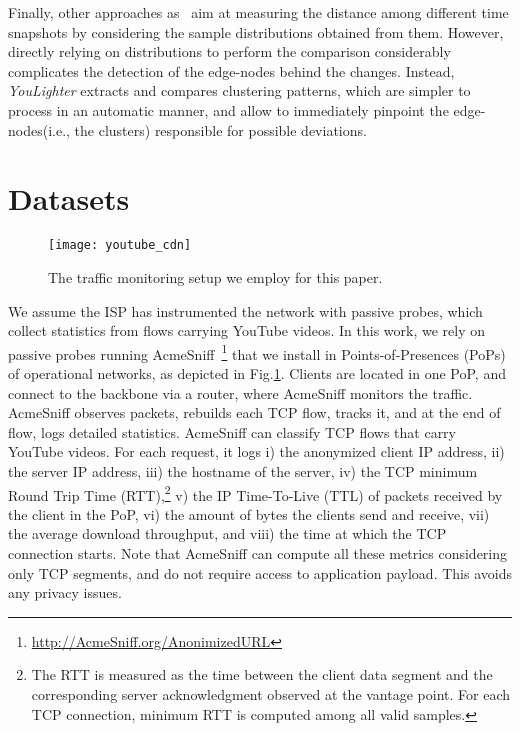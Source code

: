 \documentclass{acm_proc_article-sp}
\newcommand{\tool}{\textit{YouLighter}\xspace}
\newcommand{\nodes}{{edge-nodes}\xspace}
\newcommand{\tstat}{{AcmeSniff}\xspace}
\begin{document}
Finally, other approaches as~\cite{KiferVLDB04} aim at measuring the distance among different time snapshots by considering the sample distributions obtained from them. However, directly relying on distributions to perform the comparison considerably complicates the detection of the \nodes behind the changes. Instead, \tool extracts and compares clustering patterns, which are simpler to process in an automatic manner, and allow to immediately pinpoint the \nodes (i.e., the clusters) responsible for possible deviations.
\section{Datasets}
\label{sec:dataset}

\begin{figure}[t!]
\centering
    \texttt{[image: youtube\_cdn]}
    \caption{The traffic monitoring setup we employ for this paper.}
    \label{fig:tstat}
\end{figure}

We assume the ISP has instrumented the network with passive probes, which collect statistics from flows carrying YouTube videos.
In this work, we rely on passive probes running \tstat~\footnote{\url{http://AcmeSniff.org/AnonimizedURL}} that we install in Points-of-Presences (PoPs) of operational networks, as depicted in Fig.\ref{fig:tstat}. Clients are located in one PoP, and connect to the backbone via a router, where \tstat monitors the traffic.
\tstat observes packets, rebuilds each TCP flow, tracks it, and at the end of flow, logs detailed statistics.
\tstat can classify TCP flows that carry YouTube videos.
For each request, it logs i) the anonymized client IP address, ii) the server
IP address, iii) the hostname of the server, iv) the TCP minimum Round Trip Time (RTT),\footnote{The RTT is measured as the time between
the client data segment and the corresponding server acknowledgment observed at the vantage point.  For each TCP connection, minimum RTT is computed among all valid samples.} v) the IP Time-To-Live (TTL) of packets received by the client in the PoP, vi) the amount of bytes the clients send and receive, vii) the average download throughput, and viii) the time at which the TCP connection starts. Note that \tstat can compute all these metrics considering only TCP segments, and do not require access to application payload. This avoids any privacy issues.
\end{document}
